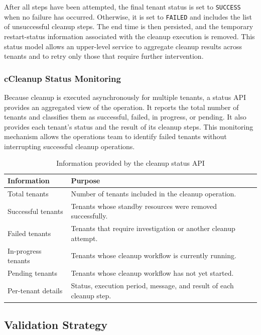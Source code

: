 After all steps have been attempted, the final tenant status is set to \texttt{SUCCESS} when no failure has occurred. Otherwise, it is set to \texttt{FAILED} and includes the list of unsuccessful cleanup steps. The end time is then persisted, and the temporary restart-status information associated with the cleanup execution is removed. This status model allows an upper-level service to aggregate cleanup results across tenants and to retry only those that require further intervention.

\subsubsection*{c\quad Cleanup Status Monitoring}

Because cleanup is executed asynchronously for multiple tenants, a status
API provides an aggregated view of the operation. It reports the total
number of tenants and classifies them as successful, failed, in progress,
or pending. It also provides each tenant's status and the result of its
cleanup steps. This monitoring mechanism allows the operations team to
identify failed tenants without interrupting successful cleanup operations.

\begin{table}[H]
\centering
\caption{Information provided by the cleanup status API}
\label{tab:cleanup-status-information}
\begin{tabularx}{\textwidth}{@{}p{3.5cm}X@{}}
\toprule
\textbf{Information} & \textbf{Purpose} \\
\midrule
Total tenants & Number of tenants included in the cleanup operation. \\
Successful tenants & Tenants whose standby resources were removed successfully. \\
Failed tenants & Tenants that require investigation or another cleanup attempt. \\
In-progress tenants & Tenants whose cleanup workflow is currently running. \\
Pending tenants & Tenants whose cleanup workflow has not yet started. \\
Per-tenant details & Status, execution period, message, and result of each cleanup step. \\
\bottomrule
\end{tabularx}
\end{table}

\subsection{Validation Strategy}

